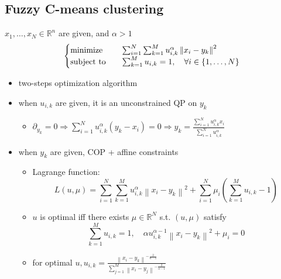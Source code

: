 \subsection{Fuzzy C-means clustering}
\begin{remark}
    $x_1, \dots, x_N \in \mathbb{R}^n$ are given, and $\alpha > 1$\[\begin{cases}
        \operatorname{minimize} \quad &\sum_{i=1}^{N} \sum_{k=1}^{M} u_{i, k}^{\alpha}\left\|x_{i}-y_{k}\right\|^{2} \\
        \operatorname{subject\ to} \quad &\sum_{k=1}^{M} u_{i, k}=1, \quad \forall i \in\{1, \ldots, N\}
    \end{cases}\]
    \begin{itemize}
        \item two-steps optimization algorithm
        \item when $u_{i, k}$ are given, it is an unconstrained QP on $y_k$\begin{itemize}
            \item $\partial_{y_{k}}=0 \Longrightarrow \sum_{i=1}^{N} u_{i, k}^{\alpha}\left(y_{k}-x_{i}\right)=0 \Longrightarrow y_{k}=\frac{\sum_{i=1}^{N} u_{i, k}^{\alpha} x_{i}}{\sum_{i=1}^{N} u_{i, k}^{\alpha}}$
        \end{itemize} 
        \item when $y_k$ are given, COP + affine constraints\begin{itemize}
            \item Lagrange function:\[L(u, \mu)=\sum_{i=1}^{N} \sum_{k=1}^{M} u_{i, k}^{\alpha}\left\|x_{i}-y_{k}\right\|^{2}+\sum_{i=1}^{N} \mu_{i}\left(\sum_{k=1}^{M} u_{i, k}-1\right)\]
            \item $u$ is optimal iff there exists $\mu \in \mathbb{R}^N$ s.t. $(u, \mu)$ satisfy\[\sum_{k=1}^{M} u_{i, k}=1, \quad \alpha u_{i, k}^{\alpha-1}\left\|x_{i}-y_{k}\right\|^{2}+\mu_{i}=0\]
            \item for optimal $u, u_{i, k} = \frac{\left\|x_{i}-y_{k}\right\|^{-\frac{2}{\alpha - 1}}}{\sum_{j=1}^{M}\left\|x_{i}-y_{j}\right\|^{-\frac{2}{\alpha-1}}}$
        \end{itemize}
    \end{itemize}
\end{remark}

